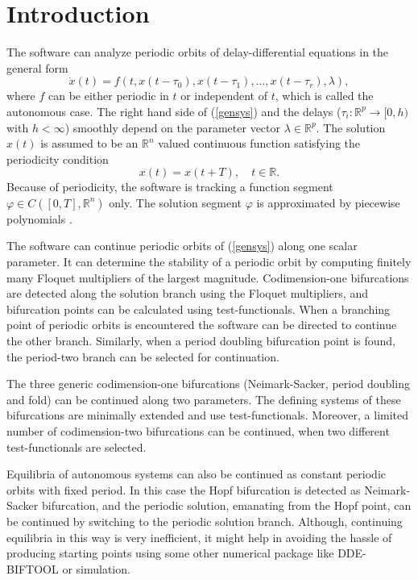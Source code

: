 \documentclass[10pt,a4paper]{ddedoc}
\begin{document}
\newpage

\tableofcontents

\newpage

\section{Introduction}

The software can analyze periodic orbits of delay-differential equations in the
general form
\begin{equation}
	\dot{x}(t) = f (t, x(t-\tau_0), x(t - \tau_1), \dots , x(t - \tau_r), \lambda
), \label{gensys}
\end{equation}
where $f$ can be either periodic in $t$ or independent of $t$, which is called
the autonomous case. The right hand side of (\ref{gensys}) and the delays
($\tau_i : \mathbb{R}^p \to [0,h)$ with $h<\infty$) smoothly depend on the
parameter vector $\lambda \in \mathbb{R}^p$. The solution $x(t)$ is assumed to
be an $\mathbb{R}^n$ valued continuous function satisfying the periodicity
condition
\[
	x(t) = x(t+T),\quad t \in \mathbb{R}.
\]
Because of periodicity, the software is tracking a function segment $\varphi \in
C([0,T],\mathbb{R}^n)$ only. The solution segment $\varphi$ is approximated by
piecewise polynomials \cite{engcol,engstab}.

The software can continue periodic orbits of (\ref{gensys}) along one scalar
parameter. It can determine the stability of a periodic orbit by computing
finitely many Floquet multipliers of the largest magnitude. Codimension-one
bifurcations are detected along the solution branch using the Floquet
multipliers, and bifurcation points can be calculated using test-functionals.
When a branching point of periodic orbits is encountered the software can be
directed to continue the other branch. Similarly, when a period doubling
bifurcation point is found, the period-two branch can be selected for
continuation.

The three generic codimension-one bifurcations (Neimark-Sacker, period doubling
and fold) can be continued along two parameters. The defining systems of these
bifurcations are minimally extended and use test-functionals. Moreover, a
limited number of codimension-two bifurcations can be continued, when two
different test-functionals are selected.

Equilibria of autonomous systems can also be continued as constant periodic
orbits with fixed period. In this case the Hopf bifurcation is detected as
Neimark-Sacker bifurcation, and the periodic solution, emanating from the Hopf
point, can be continued by switching to the periodic solution branch.
Although, continuing equilibria in this way is very inefficient, it might help
in avoiding the hassle of producing starting points using some other numerical
package like DDE-BIFTOOL \cite{DDEBIF} or simulation.
\end{document}
